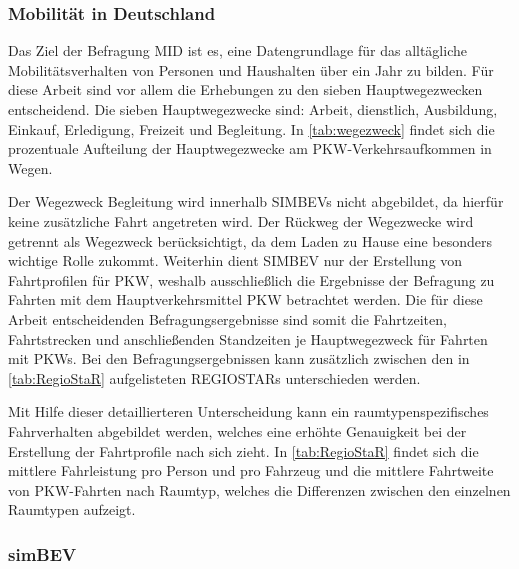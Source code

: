 \subsubsection{Mobilität in Deutschland}\label{chap:MID}

Das Ziel der Befragung \gls{MID} \cite{ISGH2017} ist es, eine Datengrundlage für das alltägliche Mobilitätsverhalten von Personen und Haushalten über ein Jahr zu bilden.
Für diese Arbeit sind vor allem die Erhebungen zu den sieben Hauptwegezwecken entscheidend.
Die sieben Hauptwegezwecke sind: Arbeit, dienstlich, Ausbildung, Einkauf, Erledigung, Freizeit und Begleitung.
In \autoref{tab:wegezweck} findet sich die prozentuale Aufteilung der Hauptwegezwecke am \gls{PKW}-Verkehrsaufkommen in Wegen.



Der Wegezweck \glqq Begleitung\grqq{} wird innerhalb \glspl{SIMBEV} nicht abgebildet, da hierfür keine zusätzliche Fahrt angetreten wird.
Der Rückweg der Wegezwecke wird getrennt als Wegezweck \nH berücksichtigt, da dem Laden zu Hause eine besonders wichtige Rolle zukommt.
Weiterhin dient \gls{SIMBEV} nur der Erstellung von Fahrtprofilen für \gls{PKW}, weshalb ausschließlich die Ergebnisse der Befragung zu Fahrten mit dem Hauptverkehrsmittel \gls{PKW} betrachtet werden.
Die für diese Arbeit entscheidenden Befragungsergebnisse sind somit die Fahrtzeiten, Fahrtstrecken und anschließenden Standzeiten je Hauptwegezweck für Fahrten mit \glspl{PKW}.
Bei den Befragungsergebnissen kann zusätzlich zwischen den in \autoref{tab:RegioStaR} aufgelisteten \glspl{REGIOSTAR} unterschieden werden.



Mit Hilfe dieser detaillierteren Unterscheidung kann ein raumtypenspezifisches Fahrverhalten abgebildet werden, welches eine erhöhte Genauigkeit bei der Erstellung der Fahrtprofile nach sich zieht.
In \autoref{tab:RegioStaR} findet sich die mittlere Fahrleistung pro Person und pro Fahrzeug und die mittlere Fahrtweite von \gls{PKW}-Fahrten nach Raumtyp, welches die Differenzen zwischen den einzelnen Raumtypen aufzeigt.




\subsubsection{simBEV}


